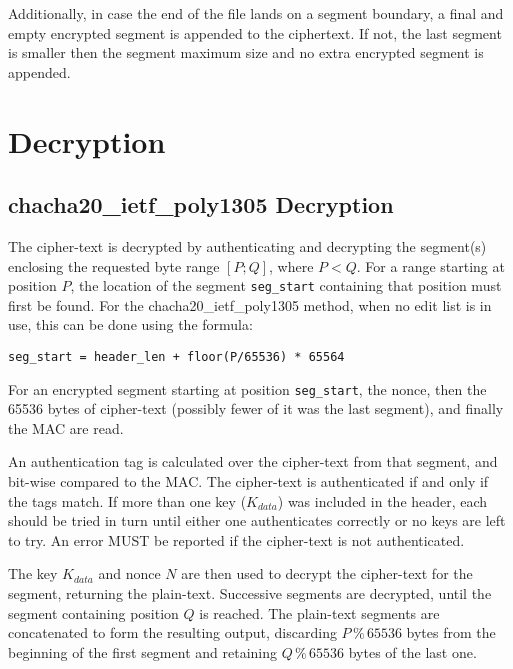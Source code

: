 \documentclass[10pt]{article}
\newcommand{\kw}[1]{\texttt{#1}}
\begin{document}
Additionally, in case the end of the file lands on a segment boundary,
a final and empty encrypted segment is appended to the ciphertext. If
not, the last segment is smaller then the segment maximum size and no
extra encrypted segment is appended.


\section{Decryption}

\subsection{chacha20\_ietf\_poly1305 Decryption}\label{data:decryption}

The cipher-text is decrypted by authenticating and decrypting the segment(s) enclosing the requested byte range $[P;Q]$,
where $P<Q$.
For a range starting at position $P$, the location of the segment \kw{seg\_start} containing that position must
first be found.
For the chacha20\_ietf\_poly1305 method, when no edit list is in use, this can be done using the formula:

\begin{verbatim}
seg_start = header_len + floor(P/65536) * 65564
\end{verbatim}

For an encrypted segment starting at position \kw{seg\_start}, the nonce, then the 65536 bytes of cipher-text
(possibly fewer of it was the last segment), and finally the MAC are read.

An authentication tag is calculated over the cipher-text from that segment, and bit-wise compared to the MAC.
The cipher-text is authenticated if and only if the tags match.
If more than one key ($K_{data}$) was included in the header,
each should be tried in turn until either one authenticates correctly or no keys are left to try.
An error MUST be reported if the cipher-text is not authenticated.

The key $K_{data}$ and nonce $N$ are then used to decrypt the cipher-text for the segment, returning the plain-text.
Successive segments are decrypted, until the segment containing position $Q$ is reached.
The plain-text segments are concatenated to form the resulting output, discarding $P \mathbin{\%} 65536$ bytes from
the beginning of the first segment and retaining $Q \mathbin{\%} 65536$ bytes of the last one.
\end{document}
